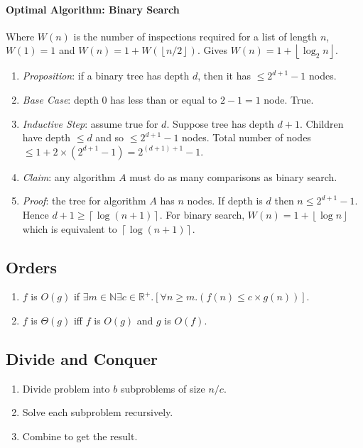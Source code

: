 \documentclass[twocolumn,english]{article}
\begin{document}
\paragraph{Optimal Algorithm: Binary Search}

Where $W\left(n\right)$ is the number of inspections required for
a list of length $n$, $W\left(1\right)=1$ and $W\left(n\right)=1+W\left(\left\lfloor n/2\right\rfloor \right)$.
Gives $W(n)=1+\left\lfloor \log_{2}n\right\rfloor $.
\begin{enumerate}
\item \emph{Proposition}: if a binary tree has depth $d$, then it has $\leq2^{d+1}-1$
nodes.
\item \emph{Base Case}: depth 0 has less than or equal to $2-1=1$ node.
True.
\item \emph{Inductive Step}: assume true for $d$. Suppose tree has depth
$d+1$. Children have depth $\leq d$ and so $\leq2^{d+1}-1$ nodes.
Total number of nodes $\leq1+2\times\left(2^{d+1}-1\right)=2^{(d+1)+1}-1$.
\item \emph{Claim}: any algorithm $A$ must do as many comparisons as binary
search.
\item \emph{Proof}: the tree for algorithm $A$ has $n$ nodes. If depth
is $d$ then $n\leq2^{d+1}-1$. Hence $d+1\geq\left\lceil \log\left(n+1\right)\right\rceil $.
For binary search, $W(n)=1+\left\lfloor \log n\right\rfloor $ which
is equivalent to $\left\lceil \log\left(n+1\right)\right\rceil $.
\end{enumerate}

\subsection{Orders}
\begin{enumerate}
\item $f$ is $O\left(g\right)$ if $\exists m\in\mathbb{N}\exists c\in\mathbb{R}^{+}.\left[\forall n\geq m.\left(f\left(n\right)\leq c\times g\left(n\right)\right)\right]$.
\item $f$ is $\Theta\left(g\right)$ iff $f$ is $O\left(g\right)$ and
$g$ is $O\left(f\right)$.
\end{enumerate}

\subsection{Divide and Conquer}
\begin{enumerate}
\item Divide problem into $b$ subproblems of size $n/c$.
\item Solve each subproblem recursively.
\item Combine to get the result.
\end{enumerate}
\end{document}
